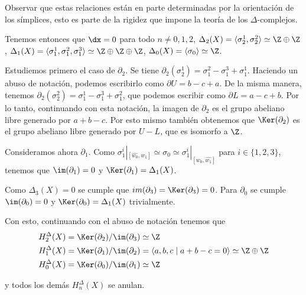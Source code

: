 \begin{ex}
Observar que estas relaciones están en parte determinadas por la orientación de los símplices, esto es parte de la rigidez que impone la teoría de los $\Delta$-complejos.\br

Tenemos entonces que $\dx=0$ para todo $n\neq 0,1,2$, $\Delta_2(X)=\langle\sigma_2^1, \sigma_2^2 \rangle\simeq\Z\oplus\Z$, $\Delta_1(X)=\langle\sigma_1^1,\sigma_1^2,\sigma_1^3\rangle\simeq\Z\oplus\Z\oplus\Z$, $\Delta_0(X)=\langle\sigma_0\rangle\simeq\Z$.\br

Estudiemos primero el caso de $\partial_2$. Se tiene $\partial_2(\sigma_2^1)=\sigma_1^2-\sigma_1^3+\sigma_1^1$. Haciendo un abuso de notación, podemos escribirlo como $\partial U=b-c+a$. De la misma manera, tenemos $\partial_2(\sigma_2^2)=\sigma_1^1-\sigma_1^3+\sigma_1^2$, que podemos escribir como $\partial L=a-c+b$. Por lo tanto, continuando con esta notación, la imagen de $\partial_2$ es el grupo abeliano libre generado por $a+b-c$. Por esto mismo también obtenemos que $\Ker(\partial_2)$ es el grupo abeliano libre generado por $U-L$, que es isomorfo a $\Z$.\br

Consideramos ahora $\partial_1$. Como $\sigma_1^i|_{[\hat{w_0},w_1]}\simeq\sigma_0\simeq\sigma_1^i|_{[w_0,\hat{w_1}]}$ para $i\in\{1,2,3\}$, tenemos que $\im(\partial_1)=0$ y $\Ker(\partial_1)=\Delta_1(X)$.\br

Como $\Delta_3(X)=0$ se cumple que $im(\partial_3)=\Ker(\partial_3)=0$. Para $\partial_0$ se cumple $\im(\partial_0)=0$ y $\Ker(\partial_0)=\Delta_1(X)$ trivialmente.\br

Con esto, continuando con el abuso de notación tenemos que 
\begin{align*}
        &H^\Delta_2(X)=\Ker(\partial_2)/\im(\partial_3)\simeq\Z \\
        &H^\Delta_1(X)=\Ker(\partial_1)/\im(\partial_2)=\langle a,b,c \;|\; a+b-c=0\rangle\simeq \Z\oplus\Z \\
        &H^\Delta_0(X)=\Ker(\partial_0)/\im(\partial_1)\simeq\Z
\end{align*}

y todos los demás $H^\Delta_n(X)$ se anulan.

\end{ex}

